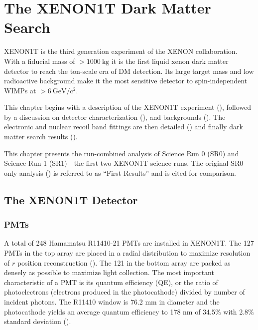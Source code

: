 

\pagestyle{cu}
\graphicspath{{./Chapter3/Figures/}}
\chapter[The XENON1T Dark Matter Search][The XENON1T Dark Matter Search]{The XENON1T Dark Matter Search}



XENON1T is the third generation experiment of the XENON collaboration.  With a fiducial mass of $> 1000\ \mathrm{kg}$ it is the first
liquid xenon dark matter detector to reach the ton-scale era of DM detection.  Its large target mass and low radioactive background
make it the most sensitive detector to spin-independent WIMPs at $> 6\ \mathrm{GeV / c^2}$.

This chapter begins with a description of the XENON1T experiment (), followed by a discussion on detector
characterization (), and backgrounds
().  The electronic and nuclear recoil band fittings are
then detailed () and finally dark matter search results ().

This chapter presents the run-combined analysis of Science Run 0 (SR0) and Science Run 1 (SR1) - the first two XENON1T science
runs.  The original SR0-only analysis () is referred to as ``First Results'' and is cited for comparison.

\section{The XENON1T Detector}
\label{sec:xenon1t_detector}




\subsection{PMTs}
\label{subsec:xenon1t_pmts}
A total of 248 Hamamatsu R11410-21 PMTs are installed in XENON1T.  The 127 PMTs in the top array are placed in a radial distribution to
maximize resolution of $r$ position reconstruction ().  The 121 in the bottom array
are packed as densely as possible to maximize light collection.  The most important characteristic of a PMT is its quantum efficiency
(QE), or the ratio of photoelectrons (electrons produced in the photocathode) divided by number of incident photons.  The R11410 window is
76.2 mm in diameter and the photocathode yields an average quantum efficiency to 178 nm of 34.5\% with 2.8\%
standard deviation ().

